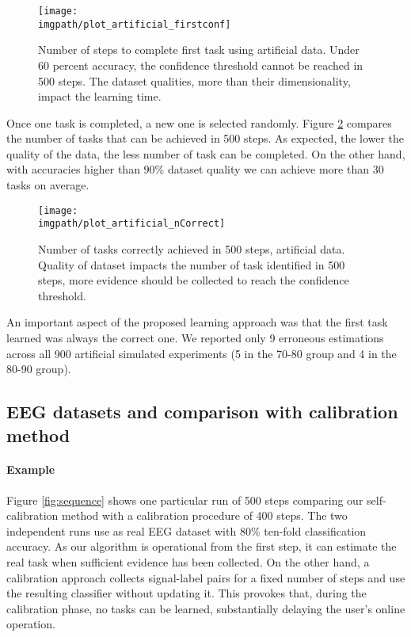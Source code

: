 \begin{figure}[!ht]
  \centering
      \texttt{[image: \\imgpath/plot\_artificial\_firstconf]}
      \caption{Number of steps to complete first task using artificial data. Under 60 percent accuracy, the confidence threshold cannot be reached in 500 steps. The dataset qualities, more than their dimensionality, impact the learning time.}
      \label{fig:firstArtificial}
\end{figure} 

Once one task is completed, a new one is selected randomly. Figure \ref{fig:nCorrectArtificial} compares the number of tasks that can be achieved in 500 steps. As expected, the lower the quality of the data, the less number of task can be completed. On the other hand, with accuracies higher than $90\%$ dataset quality we can achieve more than 30 tasks on average. 

\begin{figure}[!ht]
    \centering
    \texttt{[image: \\imgpath/plot\_artificial\_nCorrect]}
    \caption{Number of tasks correctly achieved in 500 steps, artificial data. Quality of dataset impacts the number of task identified in 500 steps, more evidence should be collected to reach the confidence threshold.}
    \label{fig:nCorrectArtificial}
\end{figure} 

An important aspect of the proposed learning approach was that the first task learned was always the correct one. We reported only 9 erroneous estimations across all 900 artificial simulated experiments (5 in the 70-80 group and 4 in the 80-90 group).

\subsection{EEG datasets and comparison with calibration method}

\paragraph{Example}
Figure \ref{fig:sequence} shows one particular run of 500 steps comparing our self-calibration method with a calibration procedure of 400 steps. The two independent runs use as real EEG dataset with $80\%$ ten-fold classification accuracy. As our algorithm is operational from the first step, it can estimate the real task when sufficient evidence has been collected. On the other hand, a calibration approach collects signal-label pairs for a fixed number of steps and use the resulting classifier without updating it. This provokes that, during the calibration phase, no tasks can be learned, substantially delaying the user's online operation.

